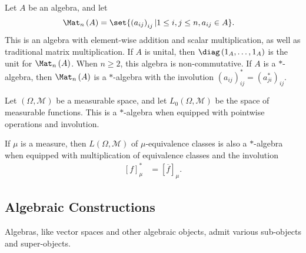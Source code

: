 \documentclass[10pt]{mypackage}
\begin{document}
\begin{example}
  Let $A$ be an algebra, and let
  \begin{align*}
    \Mat_n\left(A\right) &= \set{\left(a_{ij}\right)_{ij} | 1 \leq i,j \leq n, a_{ij}\in A}.
  \end{align*}
  This is an algebra with element-wise addition and scalar multiplication, as well as traditional matrix multiplication. If $A$ is unital, then $\diag\left(1_A,\dots,1_A\right)$ is the unit for $\Mat_n\left(A\right)$. When $n\geq 2$, this algebra is non-commutative. If $A$ is a $\ast$-algebra, then $\Mat_n\left(A\right)$ is a $\ast$-algebra with the involution $\left(a_{ij}\right)_{ij}^{\ast} = \left(a_{ji}^{\ast}\right)_{ij}$.
\end{example}
\begin{example}
  Let $\left(\Omega,\mathcal{M}\right)$ be a measurable space, and let $L_0\left(\Omega,\mathcal{M}\right)$ be the space of measurable functions. This is a $\ast$-algebra when equipped with pointwise operations and involution.\newline

  If $\mu$ is a measure, then $L\left(\Omega,\mathcal{M}\right)$ of $\mu$-equivalence classes is also a $\ast$-algebra when equipped with multiplication of equivalence classes and the involution
  \begin{align*}
    \left[f\right]_{\mu}^{\ast} &= \left[\overline{f}\right]_{\mu}.
  \end{align*}
\end{example}
\subsection{Algebraic Constructions}%
Algebras, like vector spaces and other algebraic objects, admit various sub-objects and super-objects. 
\end{document}
